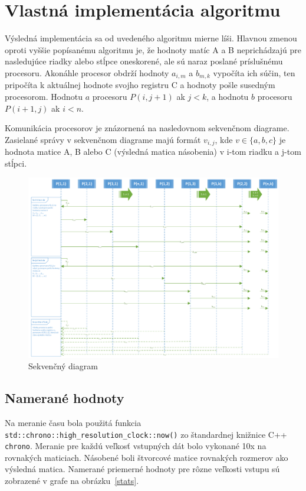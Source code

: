 \documentclass[a4paper,11pt]{article}
\begin{document}
\section{Vlastná implementácia algoritmu}
Výsledná implementácia sa od uvedeného algoritmu mierne líši. Hlavnou zmenou oproti vyššie popísanému algoritmu je, že hodnoty matíc A a B neprichádzajú pre nasledujúce riadky alebo stĺpce oneskorené, ale sú naraz poslané príslušnému procesoru. Akonáhle procesor obdrží hodnoty $ a_{i,m} $ a $ b_{m,k} $ vypočíta ich súčin, ten pripočíta k aktuálnej hodnote svojho registru C a hodnoty pošle susedným procesorom. Hodnotu $a$ procesoru $ P(i, j+1) $ ak $j<k$, a hodnotu $b$ procesoru $ P(i+1, j) $ ak $i<n$.

Komunikácia procesorov je znázornená na nasledovnom sekvenčnom diagrame. Zasielané správy v sekvenčnom diagrame majú formát $ v_{i,j} $, kde $v \in \{a, b, c\}$ je hodnota matice A, B alebo C (výsledná matica násobenia) v i-tom riadku a j-tom stĺpci.

\begin{figure}[!htb]
\centering
\includegraphics[width=\textwidth]{sequence.pdf}
\caption{Sekvenčný diagram}
\end{figure}

\subsection{Namerané hodnoty}
Na meranie času bola použitá funkcia \texttt{std::chrono::high\_resolution\_clock::now()} zo štandardnej knižnice C++ \texttt{chrono}. Meranie pre každú veľkosť vstupných dát bolo vykonané 10x na rovnakých maticiach. Násobené boli štvorcové matice rovnakých rozmerov ako výsledná matica. Namerané priemerné hodnoty pre rôzne veľkosti vstupu sú zobrazené v grafe na obrázku~\ref{stats}.
\end{document}

